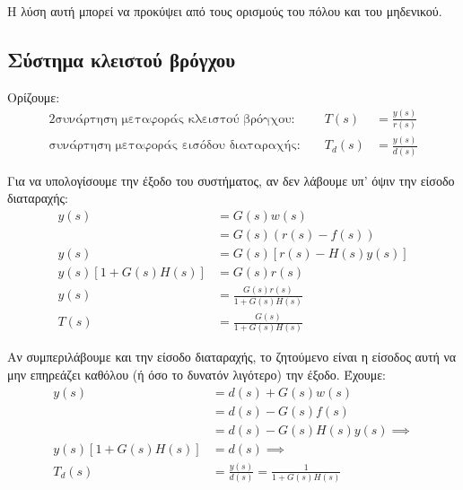 \documentclass[11pt,a4paper,notitlepage,fleqn,draft]{article}
\begin{document}
Η λύση αυτή μπορεί να προκύψει από τους ορισμούς του πόλου και του μηδενικού.

\subsection{Σύστημα κλειστού βρόγχου}


Ορίζουμε:
\begin{alignat*}{2}
	\text{συνάρτηση μεταφοράς κλειστού βρόγχου: } && T(s) &= \frac{y(s)}{r(s)} \\
	\text{συνάρτηση μεταφοράς εισόδου διαταραχής: } && T_d(s) &= \frac{y(s)}{d(s)}
\end{alignat*}

Για να υπολογίσουμε την έξοδο του συστήματος, αν δεν λάβουμε υπ' όψιν
την είσοδο διαταραχής:
\begin{align*}
	y(s) &= G(s)w(s)
	\\ &= G(s)\left( r(s)-f(s) \right) \\
	y(s) &= G(s)\left[ r(s)-H(s)y(s) \right] \\
	y(s)\left[1+G(s)H(s)\right] &= G(s)r(s) \\
	y(s) &= \frac{G(s)r(s)}{1+G(s)H(s)} \\
	T(s) &= \frac{G(s)}{1+G(s)H(s)}
\end{align*}

Αν συμπεριλάβουμε και την είσοδο διαταραχής, το ζητούμενο είναι η είσοδος αυτή να μην
επηρεάζει καθόλου (ή όσο το δυνατόν λιγότερο) την έξοδο. Έχουμε:
\begin{align*}
    y(s) &= d(s) + G(s)w(s)
    \\ &= d(s) - G(s)f(s) \\ &= d(s) - G(s)H(s)y(s) \implies \\
    y(s)\left[ 1+G(s)H(s) \right] &= d(s) \implies \\
	T_d(s) &= \frac{y(s)}{d(s)} = \frac{1}{1+G(s)H(s)}
\end{align*}
\end{document}
